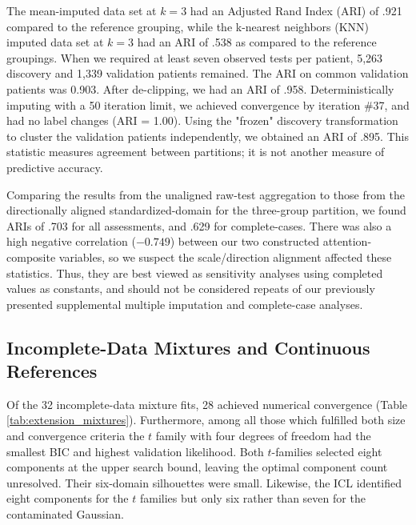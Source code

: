 The mean-imputed data set at $k=3$ had an Adjusted Rand Index (ARI) of .921 compared to the reference grouping, while the k-nearest neighbors (KNN) imputed data set at $k=3$ had an ARI of .538 as compared to the reference groupings. When we required at least seven observed tests per patient, 5,263 discovery and 1,339 validation patients remained. The ARI on common validation patients was 0.903. After de-clipping, we had an ARI of .958. Deterministically imputing with a 50 iteration limit, we achieved convergence by iteration \#37, and had no label changes (ARI = 1.00). Using the "frozen" discovery transformation to cluster the validation patients independently, we obtained an ARI of .895. This statistic measures agreement between partitions; it is not another measure of predictive accuracy.

Comparing the results from the unaligned raw-test aggregation to those from the directionally aligned standardized-domain for the three-group partition, we found ARIs of .703 for all assessments, and .629 for complete-cases. There was also a high negative correlation ($-0.749$) between our two constructed attention-composite variables, so we suspect the scale/direction alignment affected these statistics. Thus, they are best viewed as sensitivity analyses using completed values as constants, and should not be considered repeats of our previously presented supplemental multiple imputation and complete-case analyses.

\subsection{Incomplete-Data Mixtures and Continuous References}

Of the 32 incomplete-data mixture fits, 28 achieved numerical convergence (Table \ref{tab:extension_mixtures}). Furthermore, among all those which fulfilled both size and convergence criteria the $t$ family with four degrees of freedom had the smallest BIC and highest validation likelihood. Both $t$-families selected eight components at the upper search bound, leaving the optimal component count unresolved. Their six-domain silhouettes were small. Likewise, the ICL identified eight components for the $t$ families but only six rather than seven for the contaminated Gaussian.

